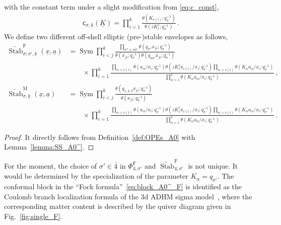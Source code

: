 \begin{proposition}
\begin{subequations}
    \end{subequations}
    with the constant term under a slight modification from \eqref{eq:c_const},
    \begin{align}
        \mathsf{c}_{\sigma,\underline{k}}(\underline{K}) = \prod_{i=1}^k \frac{\theta(K_{c(i)};q_\sigma^{-1})}{\theta(z K_i^c;q_\sigma^{-1})} \, .
        \label{eq:c_const2}
    \end{align}
    We define two different off-shell elliptic (pre-)stable envelopes as follows,
\begin{subequations}
    \begin{align}
        \widetilde{\operatorname{Stab}}_{\sigma;\sigma',\underline{k}}^\text{F}(\underline{x},\underline{a}) 
        & = \operatorname{Sym} \prod_{i<j}^k \frac{\prod_{\sigma''\in\overline{\sigma\sigma'}} \theta(q_{\sigma''} x_{ji};q_\sigma^{-1})}{\theta(x_{ji};q_\sigma^{-1})\theta(q_{\overline{\sigma\sigma'}} x_{ji};q_\sigma^{-1})} \nonumber \\
        & \qquad \times \prod_{i=1}^k \frac{\prod_{\alpha < c(i)} \theta(a_\alpha / x_i ; q_\sigma^{-1}) \theta(z K_i^c a_{c(i)} / x_i ; q_\sigma^{-1}) \prod_{\alpha > c(i)} \theta(K_\alpha a_\alpha / x_i ; q_\sigma^{-1})}{\prod_{\alpha=1}^k \theta(K_\alpha a_\alpha / x_i ; q_\sigma^{-1})} 
        \, , \\
        \widetilde{\operatorname{Stab}}_{\sigma,\underline{k}}^\text{M}(\underline{x},\underline{a}) 
        & = \operatorname{Sym} \prod_{i<j}^k \frac{\theta(q_{1,2,3} x_{ji};q_\sigma^{-1})}{\theta(x_{ji};q_\sigma^{-1})} \nonumber \\
        & \qquad \times \prod_{i=1}^k \frac{\prod_{\alpha < c(i)} \theta(a_\alpha / x_i ; q_\sigma^{-1}) \theta(z K_i^c a_{c(i)} / x_i ; q_\sigma^{-1}) \prod_{\alpha > c(i)} \theta(K_\alpha a_\alpha / x_i ; q_\sigma^{-1})}{\prod_{\alpha=1}^k \theta(K_\alpha a_\alpha / x_i ; q_\sigma^{-1})} \, .
    \end{align}
\end{subequations}
\end{proposition}
\begin{proof}
    It directly follows from Definition~\ref{def:OPEs_A0} with Lemma~\ref{lemma:SS_A0^}.
\end{proof}
For the moment, the choice of $\sigma' \in \bar{4}$ in $\Phi_{4;\sigma'}^\text{F}$ and $\widetilde{\operatorname{Stab}}^\text{F}_{4;\sigma'}$ is not unique.
It would be determined by the specialization of the parameter $K_\alpha = q_{\sigma'}$.
The conformal block in the ``Fock formula''~\eqref{eq:block_A0^_F} is identified as the Coulomb branch localization formula of the 3d ADHM sigma model~\cite{Choi:2019zpz,Crew:2020psc}, where the corresponding matter content is described by the quiver diagram given in Fig.~\ref{fig:single_F}.
